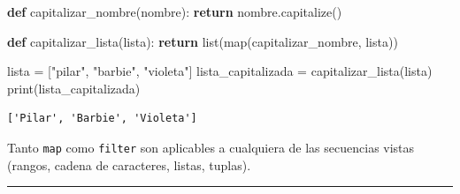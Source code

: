 \documentclass[
  letterpaper,
  DIV=11,
  numbers=noendperiod]{scrreprt}
\newenvironment{Shaded}{\begin{snugshade}}{\end{snugshade}}
\newcommand{\BuiltInTok}[1]{\textcolor[rgb]{0.00,0.23,0.31}{#1}}
\newcommand{\ControlFlowTok}[1]{\textcolor[rgb]{0.00,0.23,0.31}{\textbf{#1}}}
\newcommand{\KeywordTok}[1]{\textcolor[rgb]{0.00,0.23,0.31}{\textbf{#1}}}
\newcommand{\NormalTok}[1]{\textcolor[rgb]{0.00,0.23,0.31}{#1}}
\newcommand{\OperatorTok}[1]{\textcolor[rgb]{0.37,0.37,0.37}{#1}}
\newcommand{\StringTok}[1]{\textcolor[rgb]{0.13,0.47,0.30}{#1}}
\begin{document}
\begin{Shaded}
\begin{Highlighting}[]
\KeywordTok{def}\NormalTok{ capitalizar\_nombre(nombre):}
  \ControlFlowTok{return}\NormalTok{ nombre.capitalize()}

\KeywordTok{def}\NormalTok{ capitalizar\_lista(lista):}
  \ControlFlowTok{return} \BuiltInTok{list}\NormalTok{(}\BuiltInTok{map}\NormalTok{(capitalizar\_nombre, lista))}

\NormalTok{lista }\OperatorTok{=}\NormalTok{ [}\StringTok{"pilar"}\NormalTok{, }\StringTok{"barbie"}\NormalTok{, }\StringTok{"violeta"}\NormalTok{]}
\NormalTok{lista\_capitalizada }\OperatorTok{=}\NormalTok{ capitalizar\_lista(lista)}
\BuiltInTok{print}\NormalTok{(lista\_capitalizada)}
\end{Highlighting}
\end{Shaded}

\begin{verbatim}
['Pilar', 'Barbie', 'Violeta']
\end{verbatim}

\begin{tcolorbox}[enhanced jigsaw, arc=.35mm, toptitle=1mm, colframe=quarto-callout-note-color-frame, bottomtitle=1mm, opacitybacktitle=0.6, colbacktitle=quarto-callout-note-color!10!white, leftrule=.75mm, coltitle=black, toprule=.15mm, titlerule=0mm, title=\textcolor{quarto-callout-note-color}{\faInfo}\hspace{0.5em}{Note}, bottomrule=.15mm, rightrule=.15mm, colback=white, breakable, opacityback=0, left=2mm]

Tanto \texttt{map} como \texttt{filter} son aplicables a cualquiera de
las secuencias vistas (rangos, cadena de caracteres, listas, tuplas).

\end{tcolorbox}

\hfill\break

\begin{center}\rule{0.5\linewidth}{0.5pt}\end{center}

\hfill\break
\end{document}
